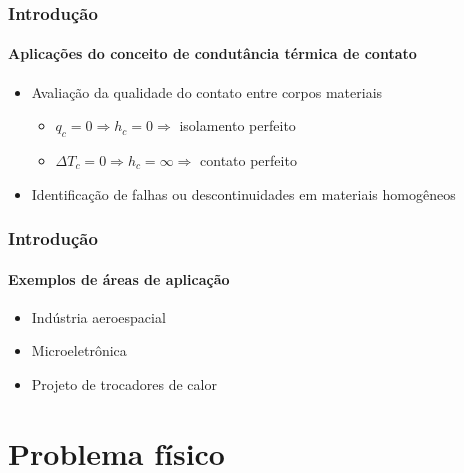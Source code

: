 \documentclass{beamer}
\begin{document}
\begin{frame}
	\frametitle{Introdução}
	\framesubtitle{Aplicações do conceito de condutância térmica de contato}
	\begin{itemize}
		\item Avaliação da qualidade do contato entre corpos materiais
		\begin{itemize}
			\item $q_c = 0 \Rightarrow h_c = 0 \Rightarrow$ isolamento perfeito
			\item $\Delta T_c = 0 \Rightarrow h_c = \infty \Rightarrow$ contato perfeito
		\end{itemize}
		\item Identificação de falhas ou descontinuidades em materiais homogêneos			
	\end{itemize}

\end{frame}
\begin{frame}
	\frametitle{Introdução}
	\framesubtitle{Exemplos de áreas de aplicação}
	\begin{itemize}
		\item Indústria aeroespacial
		\item Microeletrônica
		\item Projeto de trocadores de calor
	\end{itemize}
\end{frame}


\section{Problema físico}
\end{document}
